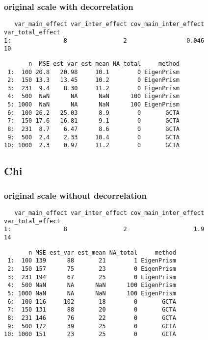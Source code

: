 \documentclass[]{article}
\begin{document}
\subsubsection{original scale with
decorrelation}\label{original-scale-with-decorrelation}

\begin{verbatim}
   var_main_effect var_inter_effect cov_main_inter_effect var_total_effect
1:               8                2                 0.046               10
\end{verbatim}

\begin{verbatim}
       n  MSE est_var est_mean NA_total     method
 1:  100 20.8   20.98     10.1        0 EigenPrism
 2:  150 13.3   13.45     10.2        0 EigenPrism
 3:  231  9.4    8.30     11.2        0 EigenPrism
 4:  500  NaN      NA      NaN      100 EigenPrism
 5: 1000  NaN      NA      NaN      100 EigenPrism
 6:  100 26.2   25.03      8.9        0       GCTA
 7:  150 17.6   16.81      9.1        0       GCTA
 8:  231  8.7    6.47      8.6        0       GCTA
 9:  500  2.4    2.33     10.4        0       GCTA
10: 1000  2.3    0.97     11.2        0       GCTA
\end{verbatim}

\subsection{Chi}\label{chi}

\subsubsection{original scale without
decorrelation}\label{original-scale-without-decorrelation-3}

\begin{verbatim}
   var_main_effect var_inter_effect cov_main_inter_effect var_total_effect
1:               8                2                   1.9               14
\end{verbatim}

\begin{verbatim}
       n MSE est_var est_mean NA_total     method
 1:  100 139      88       21        1 EigenPrism
 2:  150 157      75       23        0 EigenPrism
 3:  231 194      67       25        0 EigenPrism
 4:  500 NaN      NA      NaN      100 EigenPrism
 5: 1000 NaN      NA      NaN      100 EigenPrism
 6:  100 116     102       18        0       GCTA
 7:  150 131      88       20        0       GCTA
 8:  231 146      76       22        0       GCTA
 9:  500 172      39       25        0       GCTA
10: 1000 151      23       25        0       GCTA
\end{verbatim}
\end{document}
